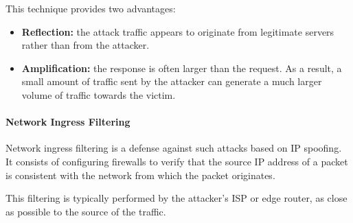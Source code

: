 \vspace{0.3em}

This technique provides two advantages:

\begin{itemize}
    \item \textbf{Reflection:} the attack traffic appears to originate from legitimate servers rather than from the attacker.
    \item \textbf{Amplification:} the response is often larger than the request. As a result, a small amount of traffic sent by the attacker can generate a much larger volume of traffic towards the victim.
\end{itemize}

\vspace{0.3em}

\paragraph{Network Ingress Filtering}

Network ingress filtering is a defense against such attacks based on IP spoofing. It consists of configuring firewalls to verify that the source IP address of a packet is consistent with the network from which the packet originates.

This filtering is typically performed by the attacker's ISP or edge router, as close as possible to the source of the traffic.